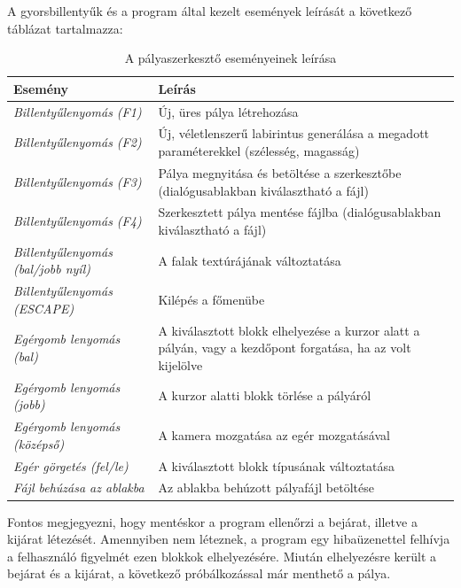 \newpage

A gyorsbillentyűk és a program által kezelt események leírását a következő táblázat tartalmazza:

\begin{table}[H]
	\centering
	\begin{tabular}{ | m{} | m{} | }
		\hline
		\textbf{Esemény} & \textbf{Leírás} \\
		\hline \hline
		\emph{Billentyűlenyomás (F1)} & Új, üres pálya létrehozása \\
		\hline
		\emph{Billentyűlenyomás (F2)} & Új, véletlenszerű labirintus generálása a megadott paraméterekkel (szélesség, magasság) \\
		\hline
		\emph{Billentyűlenyomás (F3)} & Pálya megnyitása és betöltése a szerkesztőbe (dialógusablakban kiválasztható a fájl) \\
		\hline
		\emph{Billentyűlenyomás (F4)} & Szerkesztett pálya mentése fájlba (dialógusablakban kiválasztható a fájl) \\
		\hline
		\emph{Billentyűlenyomás (bal/jobb nyíl)} & A falak textúrájának változtatása \\
		\hline
		\emph{Billentyűlenyomás (ESCAPE)} & Kilépés a főmenübe \\
		\hline
		\emph{Egérgomb lenyomás (bal)} & A kiválasztott blokk elhelyezése a kurzor alatt a pályán, vagy a kezdőpont forgatása, ha az volt kijelölve \\
		\hline
		\emph{Egérgomb lenyomás (jobb)} & A kurzor alatti blokk törlése a pályáról \\
		\hline
		\emph{Egérgomb lenyomás (középső)} & A kamera mozgatása az egér mozgatásával \\
		\hline
		\emph{Egér görgetés (fel/le)} & A kiválasztott blokk típusának változtatása \\
		\hline
		\emph{Fájl behúzása az ablakba} & Az ablakba behúzott pályafájl betöltése \\
		\hline
	\end{tabular}
	\caption{A pályaszerkesztő eseményeinek leírása}
	\label{tab:example-1}
\end{table}

Fontos megjegyezni, hogy mentéskor a program ellenőrzi a bejárat, illetve a kijárat létezését. Amennyiben nem léteznek, a program egy hibaüzenettel felhívja a felhasználó figyelmét ezen blokkok elhelyezésére. Miután elhelyezésre került a bejárat és a kijárat, a következő próbálkozással már menthető a pálya.

